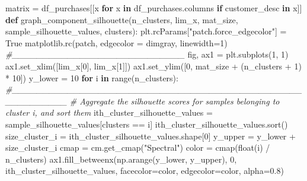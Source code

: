 \documentclass[]{tufte-book}
\newenvironment{Shaded}{}{}
\newcommand{\BuiltInTok}[1]{#1}
\newcommand{\CommentTok}[1]{\textcolor[rgb]{0.38,0.63,0.69}{\textit{#1}}}
\newcommand{\ControlFlowTok}[1]{\textcolor[rgb]{0.00,0.44,0.13}{\textbf{#1}}}
\newcommand{\DecValTok}[1]{\textcolor[rgb]{0.25,0.63,0.44}{#1}}
\newcommand{\FloatTok}[1]{\textcolor[rgb]{0.25,0.63,0.44}{#1}}
\newcommand{\KeywordTok}[1]{\textcolor[rgb]{0.00,0.44,0.13}{\textbf{#1}}}
\newcommand{\NormalTok}[1]{#1}
\newcommand{\OperatorTok}[1]{\textcolor[rgb]{0.40,0.40,0.40}{#1}}
\newcommand{\StringTok}[1]{\textcolor[rgb]{0.25,0.44,0.63}{#1}}
\newcommand{\VariableTok}[1]{\textcolor[rgb]{0.10,0.09,0.49}{#1}}
\theoremstyle{definition}
\theoremstyle{definition}
\theoremstyle{definition}
\theoremstyle{remark}
\begin{document}
\begin{Shaded}
\begin{Highlighting}[]
\NormalTok{matrix }\OperatorTok{=}\NormalTok{ df\_purchases[[x }\ControlFlowTok{for}\NormalTok{ x }\KeywordTok{in}\NormalTok{ df\_purchases.columns }
\ControlFlowTok{if} \StringTok{\textquotesingle{}customer\_desc\textquotesingle{}} \KeywordTok{in}\NormalTok{ x]]}
\KeywordTok{def}\NormalTok{ graph\_component\_silhouette(n\_clusters, lim\_x, mat\_size, sample\_silhouette\_values, clusters):}
\NormalTok{    plt.rcParams[}\StringTok{"patch.force\_edgecolor"}\NormalTok{] }\OperatorTok{=} \VariableTok{True}
\NormalTok{    matplotlib.rc(}\StringTok{\textquotesingle{}patch\textquotesingle{}}\NormalTok{, edgecolor }\OperatorTok{=} \StringTok{\textquotesingle{}dimgray\textquotesingle{}}\NormalTok{, linewidth}\OperatorTok{=}\DecValTok{1}\NormalTok{)}
    \CommentTok{\#\_\_\_\_\_\_\_\_\_\_\_\_\_\_\_\_\_\_\_\_\_\_\_\_\_\_\_\_}
\NormalTok{    fig, ax1 }\OperatorTok{=}\NormalTok{ plt.subplots(}\DecValTok{1}\NormalTok{, }\DecValTok{1}\NormalTok{)}
\NormalTok{    ax1.set\_xlim([lim\_x[}\DecValTok{0}\NormalTok{], lim\_x[}\DecValTok{1}\NormalTok{]])}
\NormalTok{    ax1.set\_ylim([}\DecValTok{0}\NormalTok{, mat\_size }\OperatorTok{+}\NormalTok{ (n\_clusters }\OperatorTok{+} \DecValTok{1}\NormalTok{) }\OperatorTok{*} \DecValTok{10}\NormalTok{])}
\NormalTok{    y\_lower }\OperatorTok{=} \DecValTok{10}
    \ControlFlowTok{for}\NormalTok{ i }\KeywordTok{in} \BuiltInTok{range}\NormalTok{(n\_clusters):}
        \CommentTok{\#\_\_\_\_\_\_\_\_\_\_\_\_\_\_\_\_\_\_\_\_\_\_\_\_\_\_\_\_\_\_\_\_\_\_\_\_\_\_\_\_\_\_\_\_\_\_\_\_\_\_\_\_\_\_\_\_\_}
        \CommentTok{\# Aggregate the silhouette scores for samples belonging to cluster i, and sort them}
\NormalTok{        ith\_cluster\_silhouette\_values }\OperatorTok{=}\NormalTok{ sample\_silhouette\_values[clusters }\OperatorTok{==}\NormalTok{ i]}
\NormalTok{        ith\_cluster\_silhouette\_values.sort()}
\NormalTok{        size\_cluster\_i }\OperatorTok{=}\NormalTok{ ith\_cluster\_silhouette\_values.shape[}\DecValTok{0}\NormalTok{]}
\NormalTok{        y\_upper }\OperatorTok{=}\NormalTok{ y\_lower }\OperatorTok{+}\NormalTok{ size\_cluster\_i}
\NormalTok{        cmap }\OperatorTok{=}\NormalTok{ cm.get\_cmap(}\StringTok{"Spectral"}\NormalTok{)}
\NormalTok{        color }\OperatorTok{=}\NormalTok{ cmap(}\BuiltInTok{float}\NormalTok{(i) }\OperatorTok{/}\NormalTok{ n\_clusters)}
\NormalTok{        ax1.fill\_betweenx(np.arange(y\_lower, y\_upper), }\DecValTok{0}\NormalTok{,    ith\_cluster\_silhouette\_values,}
\NormalTok{         facecolor}\OperatorTok{=}\NormalTok{color, edgecolor}\OperatorTok{=}\NormalTok{color, alpha}\OperatorTok{=}\FloatTok{0.8}\NormalTok{)}

\end{Highlighting}
\end{Shaded}
\end{document}

